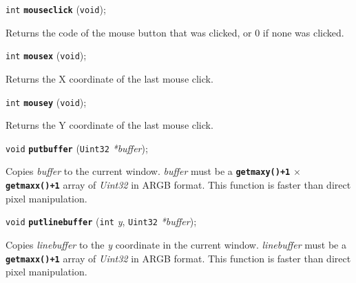 \documentclass[a4paper,12pt]{article}
\newcommand{\V}{\texttt{void}}      %
\newcommand{\I}{\texttt{int}}       %
\newcommand{\Ut}{\texttt{Uint32}}   %
\newcommand{\func}[1]{\textbf{\texttt{#1}}}  %
\newcommand{\A}[1]{\emph{#1}}       %
\newenvironment{bgi}
{ %
  \begin{snugshade}
}
{ %
  \end{snugshade}
}
\begin{document}
\begin{bgi}
\I{} \func{mouseclick} (\V{});
\end{bgi}

Returns the code of the mouse button that was clicked, or 0 if none
was clicked.


\label{sec:mousex}

\begin{bgi}
\I{} \func{mousex} (\V{});
\end{bgi}

Returns the X coordinate of the last mouse click.


\label{sec:mousey}

\begin{bgi}
\I{} \func{mousey} (\V{});
\end{bgi}

Returns the Y coordinate of the last mouse click.


\label{sec:putbuffer}

\begin{bgi}
\V{} \func{putbuffer} (\Ut{} \A{*buffer});
\end{bgi}

Copies \A{buffer} to the current window. \A{buffer} must be a
\func{getmaxy()+1} $\times$ \func{getmaxx()+1} array of \A{Uint32} in
ARGB format. This function is faster than direct pixel manipulation.


\label{sec:putlinebuffer}

\begin{bgi}
\V{} \func{putlinebuffer} (\I{} \A{y}, \Ut{} \A{*buffer});
\end{bgi}

Copies \A{linebuffer} to the \A{y} coordinate in the current window.
\A{linebuffer} must be a \func{get\-maxx()+1} array of \A{Uint32} in
ARGB format. This function is faster than direct pixel manipulation.


\label{sec:readimagefile}
\end{document}

